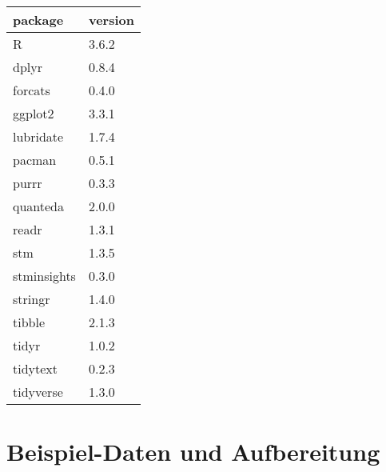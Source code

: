 \documentclass[
]{book}
\newenvironment{Shaded}{\begin{snugshade}}{\end{snugshade}}
\newcommand{\CommentTok}[1]{\textcolor[rgb]{0.56,0.35,0.01}{\textit{#1}}}
\newcommand{\ControlFlowTok}[1]{\textcolor[rgb]{0.13,0.29,0.53}{\textbf{#1}}}
\newcommand{\DataTypeTok}[1]{\textcolor[rgb]{0.13,0.29,0.53}{#1}}
\newcommand{\KeywordTok}[1]{\textcolor[rgb]{0.13,0.29,0.53}{\textbf{#1}}}
\newcommand{\NormalTok}[1]{#1}
\newcommand{\OperatorTok}[1]{\textcolor[rgb]{0.81,0.36,0.00}{\textbf{#1}}}
\newcommand{\StringTok}[1]{\textcolor[rgb]{0.31,0.60,0.02}{#1}}
\begin{document}
\begin{Shaded}
\end{Shaded}

\begin{tabular}{l|l}
\hline
package & version\\
\hline
R & 3.6.2\\
\hline
dplyr & 0.8.4\\
\hline
forcats & 0.4.0\\
\hline
ggplot2 & 3.3.1\\
\hline
lubridate & 1.7.4\\
\hline
pacman & 0.5.1\\
\hline
purrr & 0.3.3\\
\hline
quanteda & 2.0.0\\
\hline
readr & 1.3.1\\
\hline
stm & 1.3.5\\
\hline
stminsights & 0.3.0\\
\hline
stringr & 1.4.0\\
\hline
tibble & 2.1.3\\
\hline
tidyr & 1.0.2\\
\hline
tidytext & 0.2.3\\
\hline
tidyverse & 1.3.0\\
\hline
\end{tabular}

\hypertarget{beispiel-daten-und-aufbereitung}{%
\chapter{Beispiel-Daten und Aufbereitung}\label{beispiel-daten-und-aufbereitung}}
\end{document}
